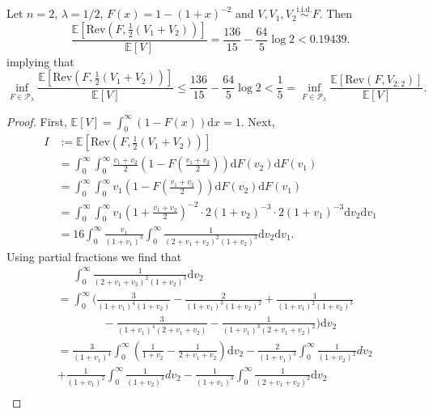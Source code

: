 \documentclass[11pt]{article}
\newcommand{\E}{\mathbb{E}}
\newcommand{\iid}{\overset{\text{i.i.d.}}{\sim}}
\newcommand{\dd}{\mathrm{d}}
\newcommand{\Rev}{\mathrm{Rev}}
\begin{document}
\begin{lemma}
Let $n = 2$, $\lambda = 1/2$, $F(x)=1-(1+x)^{-2}$ and $V,V_1,V_2\iid F$. Then
    $$
    \frac{\E\left[\Rev(F, \frac{1}{2}(V_1+V_2))\right]}{\E[V]}=\frac{136}{15}-\frac{64}{5}\log 2<0.19439.
    $$
    implying that 
    $$
    \inf_{F \in \mathcal{P}_{\lambda}} \frac{\E\left[\Rev(F, \frac{1}{2}(V_1+V_2))\right]}{\E[V]} \leq \frac{136}{15}-\frac{64}{5}\log 2 < \frac{1}{5} = \inf_{F \in \mathcal{P}_{\lambda}} \frac{\E\left[\Rev(F, V_{2:2})\right]}{\E[V]}.
    $$

\end{lemma}
\begin{proof}
    First, $\E[V]=\int_0^\infty(1-F(x))\dd x=1$. Next, 
    \begin{align*}
        I&:=\E\left[\Rev(F, \frac{1}{2}(V_1+V_2))\right]\\&=\int_0^\infty \int_0^\infty\frac{v_1+v_2}{2}\left(1-F\left(\frac{v_1+v_2}{2}\right)\right)\dd F(v_2)\dd F(v_1)\\
        &=\int_0^\infty \int_0^\infty v_1\left(1-F\left(\frac{v_1+v_2}{2}\right)\right)\dd F(v_2)\dd F(v_1)\\
        &=\int_0^\infty \int_0^\infty v_1\left(1+\frac{v_1+v_2}{2}\right)^{-2}\cdot2(1+v_2)^{-3}\cdot2(1+v_1)^{-3}\dd v_2\dd v_1\\
        &=16\int_0^\infty \frac{v_1}{(1+v_1)^3}\int_0^\infty \frac{1}{(2+v_1+v_2)^2(1+v_2)^3}\dd v_2\dd v_1.
    \end{align*}
    Using partial fractions we find that
    \begin{align*}
        &\;\;\;\;\;\int_0^\infty \frac{1}{(2+v_1+v_2)^2(1+v_2)^3}\dd v_2\\&=\int_0^\infty\Bigg(\frac{3}{\left(1+v_{1}\right)^{4}\left(1+v_{2}\right)}-\frac{2}{\left(1+v_{1}\right)^{3}\left(1+v_{2}\right)^{2}}+\frac{1}{\left(1+v_{1}\right)^{2}\left(1+v_{2}\right)^{3}}\\&\qquad\qquad-\frac{3}{\left(1+v_{1}\right)^{4}\left(2+v_{1}+v_{2}\right)}-\frac{1}{\left(1+v_{1}\right)^{3}\left(2+v_{1}+v_{2}\right)^{2}}\Bigg)\dd v_2\\
        &=\frac{3}{(1+v_1)^4}\int_0^\infty\left(\frac{1}{1+v_2}-\frac{1}{2+v_1+v_2}\right)\dd v_2
        -\frac{2}{\left(1+v_{1}\right)^{3}}\int_{0}^{\infty}\frac{1}{\left(1+v_{2}\right)^{2}}dv_{2}\\&+\frac{1}{\left(1+v_{1}\right)^{2}}\int_{0}^{\infty}\frac{1}{\left(1+v_{2}\right)^{3}}dv_{2}-\frac{1}{\left(1+v_{1}\right)^{3}}\int_{0}^{\infty}\frac{1}{\left(2+v_{1}+v_{2}\right)^{2}}\dd v_{2}\\

\end{align*}
\end{proof}
\end{document}
